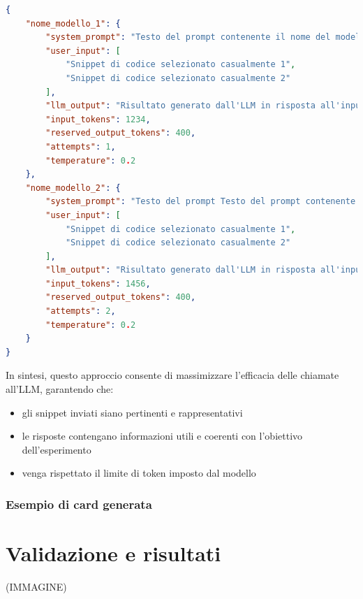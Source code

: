 \documentclass{article}
\begin{document}
\begin{lstlisting}[language=json, caption={Esempio di struttura JSON nella risposta dell'LLM}, label={lst:json-example}]
{
    "nome_modello_1": {
        "system_prompt": "Testo del prompt contenente il nome del modello 1",
        "user_input": [
            "Snippet di codice selezionato casualmente 1",
            "Snippet di codice selezionato casualmente 2"
        ],
        "llm_output": "Risultato generato dall'LLM in risposta all'input fornito",
        "input_tokens": 1234,
        "reserved_output_tokens": 400,
        "attempts": 1,
        "temperature": 0.2
    },
    "nome_modello_2": {
        "system_prompt": "Testo del prompt Testo del prompt contenente il nome del modello 2",
        "user_input": [
            "Snippet di codice selezionato casualmente 1",
            "Snippet di codice selezionato casualmente 2"
        ],
        "llm_output": "Risultato generato dall'LLM in risposta all'input fornito",
        "input_tokens": 1456,
        "reserved_output_tokens": 400,
        "attempts": 2,
        "temperature": 0.2
    }
}
\end{lstlisting}
In sintesi, questo approccio consente di massimizzare l’efficacia delle chiamate all’LLM, garantendo che:
\begin{itemize}
    \item gli snippet inviati siano pertinenti e rappresentativi
    \item le risposte contengano informazioni utili e coerenti con l’obiettivo dell’esperimento
    \item venga rispettato il limite di token imposto dal modello
\end{itemize}

\subsubsection{Esempio di card generata}

\section{Validazione e risultati}
(IMMAGINE)\\
\end{document}
